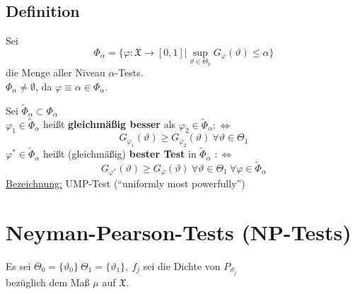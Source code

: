 \documentclass[a4paper,11pt,twoside,titlepage]{article}
\newcommand{\XX}{{\mathfrak X}} %
\begin{document}
\subsection{Definition}
Sei $$\Phi_\alpha=\{\varphi:\XX\rightarrow[0,1]|\sup_{\vartheta\in\Theta_0}G_\varphi(\vartheta)\leq\alpha\}$$
die Menge aller Niveau $\alpha$-Tests.\\
$\Phi_\alpha\neq\emptyset$, da $\varphi\equiv\alpha\in\Phi_\alpha$.

Sei $\widetilde\Phi_\alpha\subset\Phi_\alpha$\\
$\varphi_1\in\widetilde\Phi_\alpha$ heißt \textbf{gleichmäßig besser} als $\varphi_2\in\widetilde\Phi_\alpha :\Leftrightarrow$ $$G_{\varphi_1}(\vartheta)
\geq G_{\varphi_2}(\vartheta)\ \forall\vartheta\in\Theta_1$$
$\varphi^\ast\in\widetilde\Phi_\alpha$ heißt (gleichmäßig) \textbf{bester Test} in $\widetilde\Phi_\alpha$ $:\Leftrightarrow$ $$G_{\varphi^\ast}(\vartheta)\geq G_{\varphi}(\vartheta)\ \forall\vartheta\in\Theta_1\ \forall\varphi
\in\widetilde\Phi_\alpha$$
\underline{Bezeichnung:} UMP-Test ("`uniformly most powerfully"')

\section{Neyman-Pearson-Tests (NP-Tests)}
Es sei $\Theta_0=\{\vartheta_0\}\ \Theta_1=\{\vartheta_1\},\ f_j$ sei die Dichte von $P_{\vartheta_j}$\\
bezüglich dem Maß $\mu$ auf $\XX$.
\end{document}
